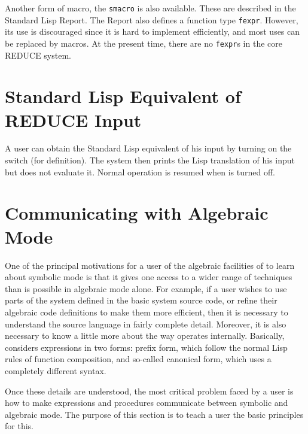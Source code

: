 \hypertarget{reserved:SMACRO}{}
\hypertarget{reserved:INLINE}{}
\hypertarget{reserved:FEXPR}{}
Another form of macro, the \texttt{smacro} is also available.
These are described in the Standard Lisp Report.  The Report also defines
a function type \texttt{fexpr}.
However, its use is discouraged since it is hard to implement efficiently,
and most uses can be replaced by macros.  At the present time, there are
no \texttt{fexpr}s in the core REDUCE system.

\section{Standard Lisp Equivalent of REDUCE Input}
\hypertarget{switch:DEFN}{}

A user can obtain the Standard Lisp equivalent of his {\REDUCE} input by
turning on the switch  (for definition).  The
system then prints the Lisp translation of his input but does not evaluate
it.  Normal operation is resumed when  is turned off.

\section{Communicating with Algebraic Mode}
\hypertarget{command:SHARE}{}

One of the principal motivations for a user of the algebraic facilities of
{\REDUCE} to learn about symbolic mode is that it
gives one access to a wider range of techniques than is possible in
algebraic mode alone.  For example, if a user
wishes to use parts of the system defined in the basic system source code,
or refine their algebraic code definitions to make them more efficient,
then it is necessary to understand the source language in fairly complete
detail.  Moreover, it is also necessary to know a little more about the
way {\REDUCE} operates internally.  Basically, {\REDUCE} considers
expressions in two forms: prefix form, which follow the normal Lisp rules
of function composition, and so-called canonical form, which uses a
completely different syntax.

Once these details are understood, the most critical problem faced by a
user is how to make expressions and procedures communicate between symbolic
and algebraic mode. The purpose of this section is to teach a user the
basic principles for this.

